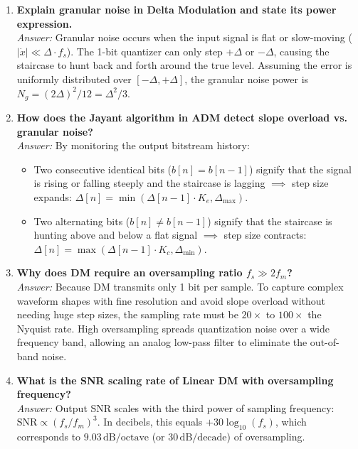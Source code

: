 \documentclass[11pt,a4paper]{article}
\begin{document}
\begin{enumerate}
    \item \textbf{Explain granular noise in Delta Modulation and state its power expression.}\\
    \textit{Answer:} Granular noise occurs when the input signal is flat or slow-moving ($|\dot{x}| \ll \Delta \cdot f_s$). The 1-bit quantizer can only step $+ \Delta$ or $- \Delta$, causing the staircase to hunt back and forth around the true level. Assuming the error is uniformly distributed over $[-\Delta, +\Delta]$, the granular noise power is $N_g = (2\Delta)^2 / 12 = \Delta^2 / 3$.

    \item \textbf{How does the Jayant algorithm in ADM detect slope overload vs. granular noise?}\\
    \textit{Answer:} By monitoring the output bitstream history:
    \begin{itemize}
        \item Two consecutive identical bits ($b[n] = b[n-1]$) signify that the signal is rising or falling steeply and the staircase is lagging $\implies$ step size expands: $\Delta[n] = \min(\Delta[n-1] \cdot K_e, \Delta_{\max})$.
        \item Two alternating bits ($b[n] \ne b[n-1]$) signify that the staircase is hunting above and below a flat signal $\implies$ step size contracts: $\Delta[n] = \max(\Delta[n-1] \cdot K_c, \Delta_{\min})$.
    \end{itemize}

    \item \textbf{Why does DM require an oversampling ratio $f_s \gg 2 f_m$?}\\
    \textit{Answer:} Because DM transmits only 1 bit per sample. To capture complex waveform shapes with fine resolution and avoid slope overload without needing huge step sizes, the sampling rate must be $20\times$ to $100\times$ the Nyquist rate. High oversampling spreads quantization noise over a wide frequency band, allowing an analog low-pass filter to eliminate the out-of-band noise.

    \item \textbf{What is the SNR scaling rate of Linear DM with oversampling frequency?}\\
    \textit{Answer:} Output SNR scales with the third power of sampling frequency: $\mathrm{SNR} \propto (f_s / f_m)^3$. In decibels, this equals $+30 \log_{10}(f_s)$, which corresponds to $\mathbf{9.03\,\mathrm{dB / octave}}$ (or $30\,\mathrm{dB / decade}$) of oversampling.


\end{enumerate}
\end{document}
